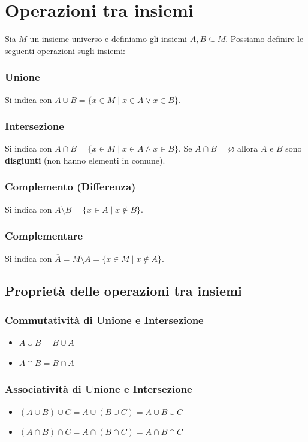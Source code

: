 \section{Operazioni tra insiemi}
Sia $M$ un insieme universo e definiamo gli insiemi $A, B \subseteq M$. Possiamo definire le seguenti operazioni sugli insiemi:

\subsubsection{Unione}
Si indica con $A \cup B = \{x \in M \mid x \in A \lor x \in B\}$.

\subsubsection{Intersezione}
Si indica con $A \cap B = \{x \in M \mid x \in A \land x \in B\}$. Se $A \cap B = \varnothing$ allora $A$ e $B$ sono \textbf{disgiunti} (non hanno elementi in comune).

\subsubsection{Complemento (Differenza)}
Si indica con $A \setminus B = \{x \in A \mid x \notin B\}$.

\subsubsection{Complementare}
Si indica con $\overline{A} = M \setminus A = \{x \in M \mid x \notin A\}$.

\subsection{Proprietà delle operazioni tra insiemi}

\subsubsection{Commutatività di Unione e Intersezione}
\begin{itemize}
    \item $A \cup B = B \cup A$
    \item $A \cap B = B \cap A$
\end{itemize}

\subsubsection{Associatività di Unione e Intersezione}
\begin{itemize}
    \item $(A \cup B) \cup C = A \cup (B \cup C) = A \cup B \cup C$
    \item $(A \cap B) \cap C = A \cap (B \cap C) = A \cap B \cap C$
\end{itemize}

